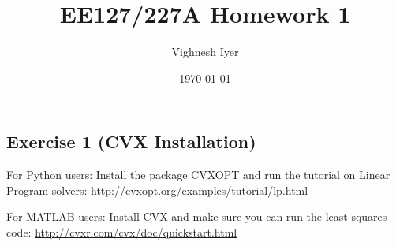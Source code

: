 \documentclass[11pt]{article}
\begin{document}
\title{EE127/227A Homework 1}
\author{Vighnesh Iyer}
\date{\today}
\maketitle

\subsection*{Exercise 1 (CVX Installation)}

For Python users:
Install the package CVXOPT and run the tutorial on Linear Program solvers: \url{http://cvxopt.org/examples/tutorial/lp.html}

For MATLAB users: Install CVX and make sure you can run the least squares code: \url{http://cvxr.com/cvx/doc/quickstart.html}
\end{document}
